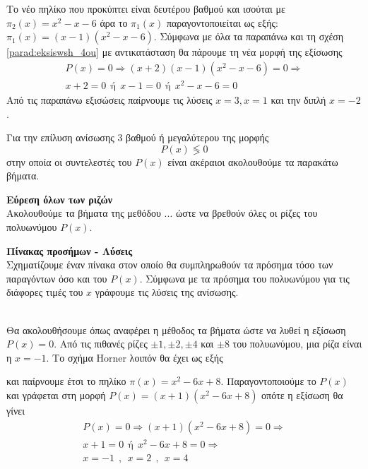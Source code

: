 Το νέο πηλίκο που προκύπτει είναι δευτέρου βαθμού και ισούται με $ \pi_2(x)=x^2-x-6 $ άρα το $ \pi_1(x) $ παραγοντοποιείται ως εξής: $ \pi_1(x)=(x-1)\left( x^2-x-6\right)  $. Σύμφωνα με όλα τα παραπάνω και τη σχέση \eqref{parad:eksiswsh_4ou} με αντικατάσταση θα πάρουμε τη νέα μορφή της εξίσωσης
\begin{gather*}
P(x)=0\Rightarrow(x+2)(x-1)\left( x^2-x-6\right)=0\Rightarrow\\
x+2=0\ \ \textrm{ή}\ \ x-1=0\ \ \textrm{ή}\ \ x^2-x-6=0
\end{gather*}
Από τις παραπάνω εξισώσεις παίρνουμε τις λύσεις $ x=3,x=1 $ και την διπλή $ x=-2 $.
\begin{Methodos}{9cm}
Για την επίλυση ανίσωσης 3 βαθμού ή μεγαλύτερου της μορφής
\[ P(x)\lessgtr 0 \]
στην οποία οι συντελεστές του $ P(x) $ είναι ακέραιοι ακολουθούμε τα παρακάτω βήματα.
\begin{bhma}
\item\textbf{Εύρεση όλων των ριζών}\\
Ακολουθούμε τα βήματα της μεθόδου ... ώστε να βρεθούν όλες οι ρίζες του πολυωνύμου $ P(x) $.
\item \textbf{Πίνακας προσήμων - Λύσεις}\\
Σχηματίζουμε έναν πίνακα στον οποίο θα συμπληρωθούν τα πρόσημα τόσο των παραγόντων όσο και του $ P(x) $. Σύμφωνα με τα πρόσημα του πολυωνύμου για τις διάφορες τιμές του $ x $ γράφουμε τις λύσεις της ανίσωσης. 	
\end{bhma}
\end{Methodos}
\lysh\\
Θα ακολουθήσουμε όπως αναφέρει η μέθοδος τα βήματα ώστε να λυθεί η εξίσωση $ P(x)=0 $. Από τις πιθανές ρίζες $ \pm 1,\pm 2,\pm 4 $ και $ \pm8 $ του πολυωνύμου, μια ρίζα είναι η $ x=-1 $. Το σχήμα Horner λοιπόν θα έχει ως εξής
\begin{center}
\end{center}
και παίρνουμε έτσι το πηλίκο $ \pi(x)=x^2-6x+8 $. Παραγοντοποιούμε το $ P(x) $ και γράφεται στη μορφή $ P(x)=(x+1)\left(x^2-6x+8 \right) $ οπότε η εξίσωση θα γίνει
\begin{gather*}
P(x)=0\Rightarrow (x+1)\left(x^2-6x+8 \right)=0\Rightarrow\\
x+1=0\ \ \textrm{ή}\ \ x^2-6x+8=0\Rightarrow\\
x=-1\ \ ,\ \ x=2\ \ ,\ \ x=4
\end{gather*}
